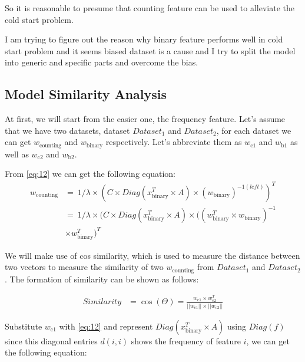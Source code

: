 So it is reasonable to presume that counting feature can be used to alleviate the cold start problem.

\iffalse
I am trying to figure out the reason why binary feature performs well in cold start problem and it seems biased dataset is a cause and I try to split the model into generic and specific parts and overcome the bias.
\subsection{Model Similarity Analysis}
At first, we will start from the easier one, the frequency feature. Let's assume that we have two datasets, dataset \(Dataset_{\text{1}}\) and \(Dataset_{\text{2}}\), for each dataset we can get \(w_{\text{counting}}\) and \(w_{\text{binary}}\) respectively. Let's abbreviate them as \(w_{\text{c1}}\) and \(w_{\text{b1}}\) as well as \(w_{\text{c2}}\) and \(w_{\text{b2}}\). 

From \ref{eq:12} we can get the following equation:
\begin{equation} \label{eq:28}
\begin{split}
w_{\text{counting}} & =\ 1/{\lambda} \times (C \times Diag(x_{\text{binary}}^T \times A) \times (w_{\text{binary}})^{-1(left)})^T \\
& = \ 1/{\lambda} \times (C \times Diag(x_{\text{binary}}^T \times A) \times ((w_{\text{binary}}^T \times w_{\text{binary}})^{-1} \\
& \times w_{\text{binary}}^T )^T
\end{split}
\end{equation}

We will make use of cos similarity, which is used to measure the distance between two vectors to measure the similarity of two \(w_{\text{counting}}\) from \(Dataset_{\text{1}}\) and \(Dataset_{\text{2}}\). The formation of similarity can be shown as follows:

\begin{equation} \label{29} 
\begin{split}
Similarity & = \cos(\Theta) = \frac{w_{\text{c1}} \times w_{\text{c2}}^T} {||w_{\text{c1}}|| \times ||w_{\text{c2}}|| }
\end{split}
\end{equation}

Substitute \(w_{\text{c1}}\) with \ref{eq:12} and represent \(Diag(x_{\text{binary}}^T \times A)\) using \(Diag(f)\) since this diagonal entries \(d(i,i) \) shows the frequency of feature \(i\), we can get the following equation:


